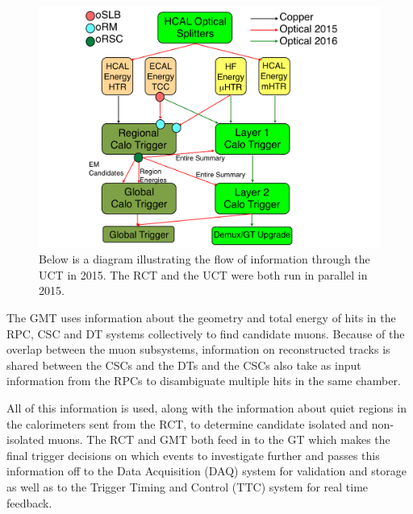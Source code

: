 \begin{figure}[htb]
\caption[The 2015 Upgrade Calorimeter Trigger]{
Below is a diagram illustrating the flow
 of information through the UCT in 2015.
The RCT and the UCT were both run in parallel
 in 2015.}
\label{fig:l1uct}
\includegraphics[width=\textwidth]{pdfs/experiment/l1upgrade.pdf}
\end{figure}

The GMT uses information about the geometry and total energy 
 of hits in the RPC, CSC and DT systems collectively %
 to find candidate muons.
Because of the overlap between the muon subsystems,
 information on reconstructed tracks is shared between the
 CSCs and the DTs and the CSCs also take as input
 information from the RPCs to disambiguate multiple
 hits in the same chamber.

All of this information is used, along with the
 information about quiet regions in the calorimeters
 sent from the RCT, to determine candidate isolated
 and non-isolated muons.
The RCT and GMT both feed in to the GT
 which makes the final trigger decisions
 on which events to investigate further
 and passes this information off to the
 Data Acquisition (DAQ) system for validation and storage
 as well as to the Trigger Timing and Control (TTC) system
 for real time feedback.


